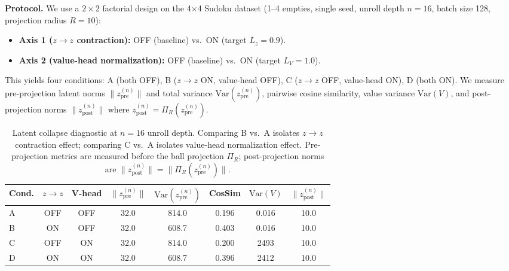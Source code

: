 \documentclass{article}
\theoremstyle{plain}
\theoremstyle{definition}
\theoremstyle{remark}
\begin{document}
\textbf{Protocol.}
We use a $2\times 2$ factorial design on the 4$\times$4 Sudoku dataset (1--4 empties, single seed, unroll depth $n{=}16$, batch size 128, projection radius $R{=}10$):
\begin{itemize}
\item \textbf{Axis 1 ($z\!\to\!z$ contraction):} OFF (baseline) vs.\ ON (target $L_z=0.9$).
\item \textbf{Axis 2 (value-head normalization):} OFF (baseline) vs.\ ON (target $L_V=1.0$).
\end{itemize}
This yields four conditions: A (both OFF), B ($z\!\to\!z$ ON, value-head OFF), C ($z\!\to\!z$ OFF, value-head ON), D (both ON).
We measure pre-projection latent norms $\|z^{(n)}_{\text{pre}}\|$ and total variance $\mathrm{Var}(z^{(n)}_{\text{pre}})$, pairwise cosine similarity, value variance $\mathrm{Var}(V)$, and post-projection norms $\|z^{(n)}_{\text{post}}\|$ where $z^{(n)}_{\text{post}}=\Pi_R(z^{(n)}_{\text{pre}})$.

\begin{table}[t]
\caption{Latent collapse diagnostic at $n{=}16$ unroll depth.
Comparing B vs.\ A isolates $z\!\to\!z$ contraction effect; comparing C vs.\ A isolates value-head normalization effect.
Pre-projection metrics are measured before the ball projection $\Pi_R$; post-projection norms are $\|z^{(n)}_{\text{post}}\|=\|\Pi_R(z^{(n)}_{\text{pre}})\|$.}
\label{tab:latent_collapse}
\centering
\small
\begin{tabular}{@{}lccccccc@{}}
\toprule
Cond. & $z\!\to\!z$ & V-head & $\|z^{(n)}_{\text{pre}}\|$ & $\mathrm{Var}(z^{(n)}_{\text{pre}})$ & CosSim & $\mathrm{Var}(V)$ & $\|z^{(n)}_{\text{post}}\|$ \\
\midrule
A & OFF & OFF & 32.0 & 814.0 & 0.196 & 0.016 & 10.0 \\
B & ON & OFF & 32.0 & 608.7 & 0.403 & 0.016 & 10.0 \\
C & OFF & ON & 32.0 & 814.0 & 0.200 & 2493 & 10.0 \\
D & ON & ON & 32.0 & 608.7 & 0.396 & 2412 & 10.0 \\
\bottomrule
\end{tabular}
\end{table}
\end{document}
